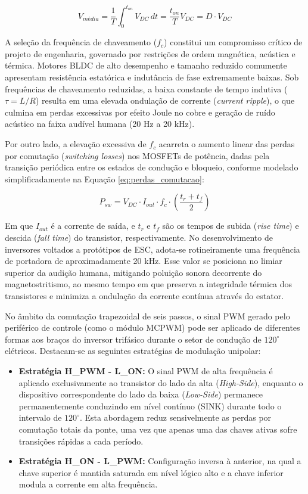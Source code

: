 \begin{equation}
V_{m\text{é}dia} = \frac{1}{T} \int_{0}^{t_{on}} V_{DC} \, dt = \frac{t_{on}}{T} V_{DC} = D \cdot V_{DC}
\label{eq:v_media}
\end{equation}

A seleção da frequência de chaveamento ($f_c$) constitui um compromisso crítico de projeto de engenharia, governado por restrições de ordem magnética, acústica e térmica. Motores BLDC de alto desempenho e tamanho reduzido comumente apresentam resistência estatórica e indutância de fase extremamente baixas. Sob frequências de chaveamento reduzidas, a baixa constante de tempo indutiva ($\tau = L/R$) resulta em uma elevada ondulação de corrente (\textit{current ripple}), o que culmina em perdas excessivas por efeito Joule no cobre e geração de ruído acústico na faixa audível humana (20 Hz a 20 kHz). 

Por outro lado, a elevação excessiva de $f_c$ acarreta o aumento linear das perdas por comutação (\textit{switching losses}) nos MOSFETs de potência, dadas pela transição periódica entre os estados de condução e bloqueio, conforme modelado simplificadamente na Equação \ref{eq:perdas_comutacao}:

\begin{equation}
P_{sw} = V_{DC} \cdot I_{out} \cdot f_c \cdot \left( \frac{t_r + t_f}{2} \right)
\label{eq:perdas_comutacao}
\end{equation}

Em que $I_{out}$ é a corrente de saída, e $t_r$ e $t_f$ são os tempos de subida (\textit{rise time}) e descida (\textit{fall time}) do transistor, respectivamente. No desenvolvimento de inversores voltados a protótipos de ESC, adota-se rotineiramente uma frequência de portadora de aproximadamente 20 kHz. Esse valor se posiciona no limiar superior da audição humana, mitigando poluição sonora decorrente do magnetostritismo, ao mesmo tempo em que preserva a integridade térmica dos transistores e minimiza a ondulação da corrente contínua através do estator.

No âmbito da comutação trapezoidal de seis passos, o sinal PWM gerado pelo periférico de controle (como o módulo MCPWM) pode ser aplicado de diferentes formas aos braços do inversor trifásico durante o setor de condução de $120^\circ$ elétricos. Destacam-se as seguintes estratégias de modulação unipolar:

\begin{itemize}
    \item \textbf{Estratégia H\_PWM - L\_ON:} O sinal PWM de alta frequência é aplicado exclusivamente ao transistor do lado da alta (\textit{High-Side}), enquanto o dispositivo correspondente do lado da baixa (\textit{Low-Side}) permanece permanentemente conduzindo em nível contínuo (SINK) durante todo o intervalo de $120^\circ$. Esta abordagem reduz sensivelmente as perdas por comutação totais da ponte, uma vez que apenas uma das chaves ativas sofre transições rápidas a cada período.
    \item \textbf{Estratégia H\_ON - L\_PWM:} Configuração inversa à anterior, na qual a chave superior é mantida saturada em nível lógico alto e a chave inferior modula a corrente em alta frequência.
\end{itemize}

